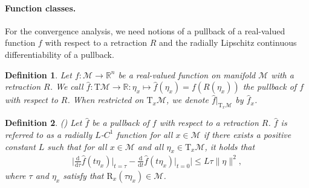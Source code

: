 \documentclass[11pt]{article}
\newtheorem{definition}{Definition}[section]
\numberwithin{equation}{section}
\begin{document}
\paragraph{Function classes.} 
For the convergence analysis, we need notions of a pullback of a real-valued function $f$ with respect to a retraction $R$ and the radially Lipschitz continuous differentiability of a pullback. 
\begin{definition} \label{PrelNotat-Pullback}
	Let $f: \mathcal{M} \rightarrow \mathbb{R}^n$ be a real-valued function on manifold $\mathcal{M}$ with a retraction $R$. We call $\hat{f}:\mathrm{T}\mathcal{M} \rightarrow \mathbb{R}: \eta_x \mapsto \hat{f}(\eta_x)=f(R(\eta_x))$ the pullback of $f$ with respect to $R$. When restricted on $\mathrm{T}_x\mathcal{M}$, we denote $\hat{f}\big|_{\mathrm{T}_x\mathcal{M}}$ by $\hat{f}_x$.
\end{definition}
\begin{definition} (\cite[Definition 7.4.1]{AbsMahSep2008}) 
\label{PrelNotat-RLipConti}
  Let $\hat{f}$ be a pullback of $f$ with respect to a retraction $R$. $\hat{f}$ is referred to as a radially $L$-$C^1$ function for all $x\in \mathcal{M}$ if there exists a positive constant $L$ such that for all $x\in \mathcal{M}$ and all $\eta_x\in \mathrm{T}_x\mathcal{M}$, it holds that 
  \begin{equation}
    \begin{aligned}
      \bigg| \frac{\mathrm{d}}{\mathrm{d}\tau}\hat{f}(t\eta_x)\big|_{t=\tau} - \frac{\mathrm{d}}{\mathrm{d}t}\hat{f}(t\eta_x)\big|_{t=0} \bigg|\le L \tau\|\eta\|^2,
    \end{aligned}
  \end{equation}
  where $\tau$ and $\eta_x$ satisfy that $\mathrm{R}_x(\tau\eta_x)\in \mathcal{M}$.
\end{definition}


\end{document}

